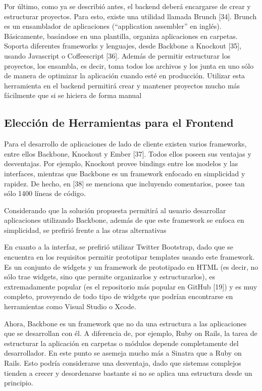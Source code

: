 \documentclass[12pt,spanish,letter]{report}
\begin{document}
Por último, como ya se describió antes, el backend deberá encargarse de
crear y estructurar proyectos. Para esto, existe una utilidad llamada
Brunch {[}34{]}. Brunch es un ensamblador de aplicaciones (``application
assembler'' en inglés). Básicamente, basándose en una plantilla,
organiza aplicaciones en carpetas. Soporta diferentes frameworks y
lenguajes, desde Backbone a Knockout {[}35{]}, usando Javascript o
Coffeescript {[}36{]}. Además de permitir estructurar los proyectos, los
ensambla, es decir, toma todos los archivos y los junta en uno sólo de
manera de optimizar la aplicación cuando esté en producción. Utilizar
esta herramienta en el backend permitirá crear y mantener proyectos
mucho más fácilmente que si se hiciera de forma manual

\subsection{Elección de Herramientas para el Frontend}

Para el desarrollo de aplicaciones de lado de cliente existen varios
frameworks, entre ellos Backbone, Knockout y Ember {[}37{]}. Todos ellos
poseen sus ventajas y desventajas. Por ejemplo, Knockout provee bindings
entre los modelos y las interfaces, mientras que Backbone es un
framework enfocado en simplicidad y rapidez. De hecho, en {[}38{]} se
menciona que incluyendo comentarios, posee tan sólo 1400 líneas de
código.

Considerando que la solución propuesta permitirá al usuario desarrollar
aplicaciones utilizando Backbone, además de que este framework se enfoca
en simplicidad, se prefirió frente a las otras alternativas

En cuanto a la interfaz, se prefirió utilizar Twitter Bootstrap, dado
que se encuentra en los requisitos permitir prototipar templates usando
este framework. Es un conjunto de widgets y un framework de prototipado
en HTML (es decir, no sólo trae widgets, sino que permite organizarlos y
estructurarlos), es extremadamente popular (es el repositorio más
popular en GitHub {[}19{]}) y es muy completo, proveyendo de todo tipo
de widgets que podrían encontrarse en herramientas como Visual Studio o
Xcode.

Ahora, Backbone es un framework que no da una estructura a las
aplicaciones que se desarrollan con él. A diferencia de, por ejemplo,
Ruby on Rails, la tarea de estructurar la aplicación en carpetas o
módulos depende completamente del desarrollador. En este punto se
asemeja mucho más a Sinatra que a Ruby on Rails. Esto podría
considerarse una desventaja, dado que sistemas complejos tienden a
crecer y desordenarse bastante si no se aplica una estructura desde un
principio.
\end{document}
